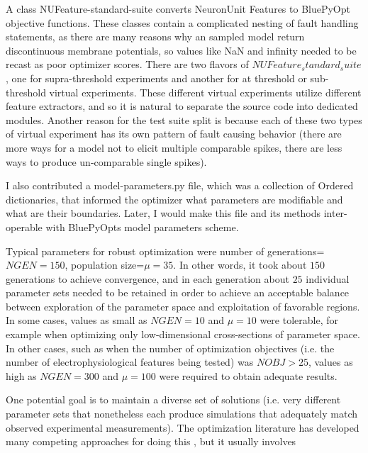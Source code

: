 
A class NUFeature-standard-suite converts NeuronUnit Features to BluePyOpt objective functions. These classes contain a complicated nesting of fault handling statements, as there are many reasons why an sampled model return discontinuous membrane potentials, so values like NaN and infinity needed to be recast as poor optimizer scores. There are two flavors of $NUFeature_standard_suite$, one for supra-threshold experiments and another for at threshold or sub-threshold virtual experiments. These different virtual experiments utilize different feature extractors, and so it is natural to separate the source code into dedicated modules. Another reason for the test suite split is because each of these two types of virtual experiment has its own pattern of fault causing behavior (there are more ways for a model not to elicit multiple comparable spikes, there are less ways to produce un-comparable single spikes).
 
I also contributed a model-parameters.py file, which was a collection of Ordered dictionaries, that informed the optimizer what parameters are modifiable and what are their boundaries. Later, I would make this file and its methods inter-operable with BluePyOpts model parameters scheme.


Typical parameters for robust optimization were number of generations=$NGEN=150$, population size=$\mu=35$.
In other words, it took about $150$ generations to achieve convergence, and in each generation about $25$ individual parameter sets needed to be retained in order to achieve an acceptable balance between exploration of the parameter space and exploitation of favorable regions.
In some cases, values as small as $NGEN=10$ and $\mu=10$ were tolerable, for example when optimizing only low-dimensional cross-sections of parameter space.
In other cases, such as when the number of optimization objectives (i.e. the number of electrophysiological features being tested) was $NOBJ>25$, values as high as $NGEN=300$ and $\mu=100$ were required to obtain adequate results.

One potential goal is to maintain a diverse set of solutions (i.e. very different parameter sets that nonetheless each produce simulations that adequately match observed experimental measurements).
The optimization literature has developed many competing approaches for doing this \cite{deb2000fast}, but it usually involves  

